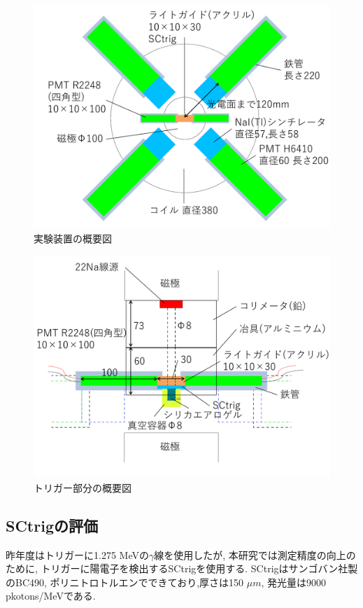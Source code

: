 \begin{figure}[H]
\centering
\includegraphics[keepaspectratio,scale=0.4]{fig/ybm/device2.pdf}
\caption{実験装置の概要図}
\label{fig:device2}
\end{figure}

\begin{figure}[H]
\centering
\includegraphics[keepaspectratio,scale=0.4]{fig/ybm/device3.pdf}
\caption{トリガー部分の概要図}
\label{fig:device3}
\end{figure}



\subsection{SCtrigの評価}

昨年度はトリガーに1.275 MeVの$\gamma$線を使用したが,
本研究では測定精度の向上のために,
トリガーに陽電子を検出するSCtrigを使用する.
SCtrigはサンゴバン社製のBC490,
ポリニトロトルエンでできており,厚さは150 $\si{\mu m}$,
発光量は9000 pkotons/MeVである.
